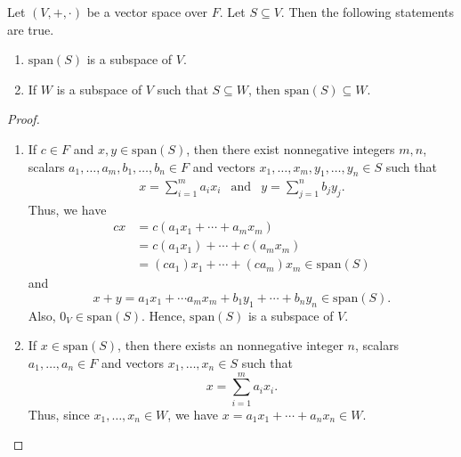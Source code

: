 \begin{theorem}\label{thm:span}
  Let $(V, +, \cdot)$ be a vector space over $F$.
  Let $S \subseteq V$. Then the following statements are true.
  \begin{enumerate}
    \item $\mathrm{span}(S)$ is a subspace of $V$.
    \item If $W$ is a subspace of $V$ such that $S \subseteq W$, then
      $\mathrm{span}(S) \subseteq W$.
  \end{enumerate}
\end{theorem}
\begin{proof} \leavevmode
\begin{enumerate}
  \item If $c \in F$ and $x, y \in \mathrm{span}(S)$, then there exist
    nonnegative integers $m, n$,
    scalars $a_1, \dots, a_m, b_1, \dots, b_n \in F$
    and vectors $x_1, \dots, x_m, y_1, \dots, y_n \in S$ such that
    \begin{equation*}
      \begin{array}{lll}
        \displaystyle x = \sum_{i=1}^m a_ix_i
        & \text{and}
        & \displaystyle y = \sum_{j=1}^n b_jy_j.
      \end{array}
    \end{equation*}
    Thus, we have
    \begin{align*}
      cx
      &= c(a_1x_1 + \cdots + a_mx_m) \\
      &= c(a_1x_1) + \cdots + c(a_mx_m) \\
      &= (ca_1)x_1 + \cdots + (ca_m)x_m \in \mathrm{span}(S)
    \end{align*}
    and
    \begin{equation*}
      x + y
        = a_1x_1 + \cdots a_mx_m + b_1y_1 + \cdots + b_ny_n
        \in \mathrm{span}(S).
    \end{equation*}
    Also, $0_V \in \mathrm{span}(S)$.
    Hence, $\mathrm{span}(S)$ is a subspace of $V$.
  \item If $x \in \mathrm{span}(S)$, then there exists an
    nonnegative integer $n$, scalars $a_1, \dots, a_n \in F$
    and vectors $x_1, \dots, x_n \in S$ such that
    \begin{equation*}
      x = \sum_{i=1}^m a_ix_i.
    \end{equation*}
    Thus, since $x_1, \dots, x_n \in W$, we have
    $x = a_1x_1 + \cdots + a_nx_n \in W$. \qedhere
\end{enumerate}
\end{proof}


